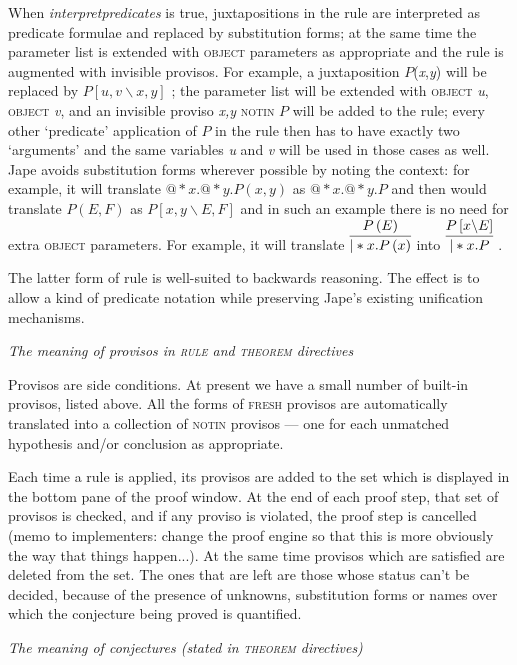 When \textit{interpretpredicates} is true, juxtapositions in the rule are interpreted as predicate formulae and replaced by substitution forms; at the same time the parameter list is extended with \textsc{object} parameters as appropriate and the rule is augmented with invisible provisos. For example, a juxtaposition $P$(\textit{x},\textit{y}) will be replaced by $P\left[ u,v\backslash x,y\right] $ ; the parameter list will be extended with \textsc{object} \textit{u}, \textsc{object} \textit{v}, and an invisible proviso \textit{x,y} \textsc{notin} $P$ will be added to the rule; every other `predicate' application of $P$ in the rule then has to have exactly two `arguments' and the same variables \textit{u} and \textit{v} will be used in those cases as well. Jape avoids substitution forms wherever possible by noting the context: for example, it will translate $@*x.@*y.P\left( x,y\right) $ as $@*x.@*y.P$ and then would translate $P\left( E,F\right) $ as $P\left[ x,y\backslash E,F\right] $ and in such an example there is no need for extra \textsc{object} parameters. For example, it will translate $\infer{|*x.P\left( x\right) }
       {P\left( E\right) }$ into $\infer{|*x.P}
       {P\left[ x\backslash E\right] }$ .


The latter form of rule is well-suited to backwards reasoning. The effect is to allow a kind of predicate notation while preserving Jape's existing unification mechanisms.


\textit{The meaning of provisos in \textsc{rule} and \textsc{theorem} directives}


Provisos are side conditions. At present we have a small number of built-in provisos, listed above. All the forms of \textsc{fresh} provisos are automatically translated into a collection of \textsc{notin} provisos --- one for each unmatched hypothesis and/or conclusion as appropriate.


Each time a rule is applied, its provisos are added to the set which is displayed in the bottom pane of the proof window. At the end of each proof step, that set of provisos is checked, and if any proviso is violated, the proof step is cancelled (memo to implementers: change the proof engine so that this is more obviously the way that things happen...). At the same time provisos which are satisfied are deleted from the set. The ones that are left are those whose status can't be decided, because of the presence of unknowns, substitution forms or names over which the conjecture being proved is quantified.


\textit{The meaning of conjectures (stated in \textsc{theorem} directives)}



